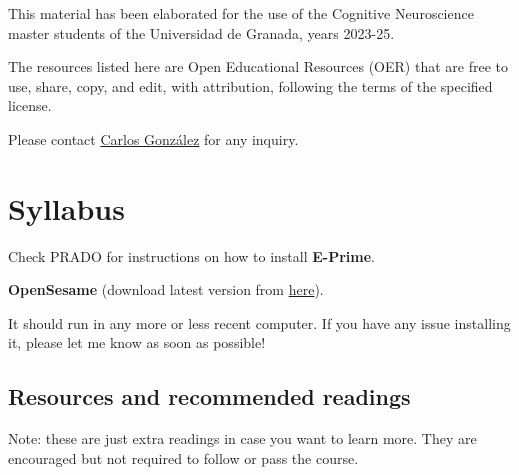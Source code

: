 \documentclass[
  letterpaper,
  DIV=11,
  numbers=noendperiod]{scrreprt}
\begin{document}
\begin{tcolorbox}[enhanced jigsaw, titlerule=0mm, left=2mm, colbacktitle=quarto-callout-warning-color!10!white, toptitle=1mm, colframe=quarto-callout-warning-color-frame, opacityback=0, leftrule=.75mm, title=\textcolor{quarto-callout-warning-color}{\faExclamationTriangle}\hspace{0.5em}{Disclaimer}, coltitle=black, breakable, colback=white, bottomrule=.15mm, bottomtitle=1mm, arc=.35mm, toprule=.15mm, opacitybacktitle=0.6, rightrule=.15mm]

This material has been elaborated for the use of the Cognitive
Neuroscience master students of the Universidad de Granada, years
2023-25.

The resources listed here are Open Educational Resources (OER) that are
free to use, share, copy, and edit, with attribution, following the
terms of the specified license.

Please contact \href{https://ugr.es/~cgonzalez}{Carlos González} for any
inquiry.

\end{tcolorbox}


\hypertarget{syllabus}{%
\chapter{Syllabus}\label{syllabus}}

Check PRADO for instructions on how to install \textbf{E-Prime}.

\textbf{OpenSesame} (download latest version from
\href{https://osdoc.cogsci.nl/4.0/download/}{here}).

It should run in any more or less recent computer. If you have any issue
installing it, please let me know as soon as possible!

\hypertarget{resources-and-recommended-readings}{%
\section{Resources and recommended
readings}\label{resources-and-recommended-readings}}

\begin{tcolorbox}[enhanced jigsaw, titlerule=0mm, left=2mm, colbacktitle=quarto-callout-note-color!10!white, toptitle=1mm, colframe=quarto-callout-note-color-frame, opacityback=0, leftrule=.75mm, title=\textcolor{quarto-callout-note-color}{\faInfo}\hspace{0.5em}{Note}, coltitle=black, breakable, colback=white, bottomrule=.15mm, bottomtitle=1mm, arc=.35mm, toprule=.15mm, opacitybacktitle=0.6, rightrule=.15mm]

Note: these are just extra readings in case you want to learn more. They
are encouraged but not required to follow or pass the course.

\end{tcolorbox}
\end{document}
